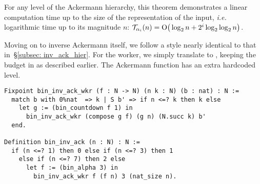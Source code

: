 \noindent For any level of the Ackermann hierarchy, this theorem demonstrates
a linear computation time up to the size of the representation of the input, \emph{i.e.} logarithmic time up to its magnitude $n$:
$\mathcal{T}_{\alpha_i}(n) = \text{O}\big(\log_2n + 2^i\log_2\log_2n \big)$.

Moving on to inverse Ackermann itself, we follow a style nearly identical to that 
in~\S\ref{subsec: inv_ack_hier}. For the worker, we simply translate to 
, keeping the budget in  as described earlier. 
The Ackermann function has an extra hardcoded level.
\begin{lstlisting}
Fixpoint bin_inv_ack_wkr (f : N -> N) (n k : N) (b : nat) : N :=
  match b with 0%nat  => k | S b' => if n <=? k then k else
    let g := (bin_countdown f 1) in 
      bin_inv_ack_wkr (compose g f) (g n) (N.succ k) b'
  end.

Definition bin_inv_ack (n : N) : N :=
  if (n <=? 1) then 0 else if (n <=? 3) then 1
    else if (n <=? 7) then 2 else
      let f := (bin_alpha 3) in 
        bin_inv_ack_wkr f (f n) 3 (nat_size n).
\end{lstlisting}

